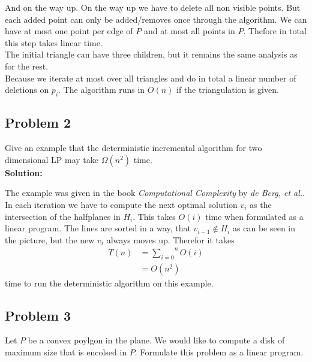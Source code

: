 \documentclass[11pt,a4paper,ngerman]{article}
\begin{document}
And on the way up. On the way up we have to delete all non visible points.
But each added point can only be added/removes once through the algorithm.
We can have at most one point per edge of $P$ and at most all points in $P$.
Thefore in total this step takes linear time.\\

The initial triangle can have three children, but it remains the same analysis
as for the rest.\\

Because we iterate at most over all triangles and do in total a linear
number of deletions on $p_i$. The algorithm
runs in $O(n)$ if the triangulation is given.

\subsection*{Problem 2}

Give an example that the deterministic incremental algorithm for two dimensional LP may take $\Omega(n^2)$ time.\\

\textbf{Solution:}\\

\vspace{15cm}

The example was given in the book \emph{Computational Complexity} by \emph{de Berg, et al.}. In each iteration we have to compute the next optimal solution $v_i$ as the intersection of the halfplanes in $H_i$. This takes $O(i)$ time when formulated as a linear program.
The lines are sorted in a way, that $v_{i-1} \not\in H_i$ as can be seen
in the picture, but the new $v_i$ always moves up. Therefor it takes
\begin{equation}\begin{split}
    T(n) &= \overset{n}{\underset{i=0}{\sum}} O(i)\\
        &= O(n^2)
\end{split}\end{equation}
time to run the deterministic algorithm on this example.

\subsection*{Problem 3}
Let $P$ be a convex poylgon in the plane. We would like to compute a disk
of maximum size that is encolsed in $P$. Formulate this problem as a linear
program.\\
\end{document}
